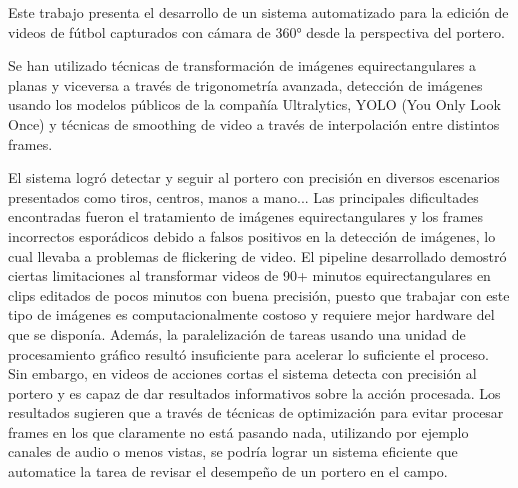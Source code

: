Este trabajo presenta el desarrollo de un sistema automatizado para la edición de videos de fútbol capturados con cámara de 360° desde la perspectiva del portero.

Se han utilizado técnicas de transformación de imágenes equirectangulares a planas y viceversa a través de trigonometría avanzada, detección de imágenes usando los modelos públicos de la compañía Ultralytics, YOLO (You Only Look Once) y técnicas de smoothing de video a través de interpolación entre distintos frames.

El sistema logró detectar y seguir al portero con precisión en diversos escenarios presentados como tiros, centros, manos a mano... Las principales dificultades encontradas fueron el tratamiento de imágenes equirectangulares y los frames incorrectos esporádicos debido a falsos positivos en la detección de imágenes, lo cual llevaba a problemas de flickering de video. El pipeline desarrollado demostró ciertas limitaciones al transformar videos de 90+ minutos equirectangulares en clips editados de pocos minutos con buena precisión, puesto que trabajar con este tipo de imágenes es computacionalmente costoso y requiere mejor hardware del que se disponía. Además, la paralelización de tareas usando una unidad de procesamiento gráfico resultó insuficiente para acelerar lo suficiente el proceso. Sin embargo, en videos de acciones cortas el sistema detecta con precisión al portero y es capaz de dar resultados informativos sobre la acción procesada. Los resultados sugieren que a través de técnicas de optimización para evitar procesar frames en los que claramente no está pasando nada, utilizando por ejemplo canales de audio o menos vistas, se podría lograr un sistema eficiente que automatice la tarea de revisar el desempeño de un portero en el campo.


